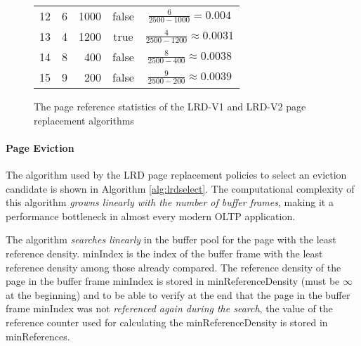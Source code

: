 \begin{@empty}
\begin{figure}[h]
\begin{tabular}{r|r|r|c|c}
            12 &   6  & 1000 & false & $\frac{6}{2500 - 1000} = 0.004$                      \\ \cline{2-4}
            13 &   4  & 1200 &  true & $\frac{4}{2500 - 1200} \approx 0.0031$               \\ \cline{2-4}
            14 &   8  &  400 & false & $\frac{8}{2500 - 400} \approx 0.0038$                \\ \cline{2-4}
            15 &   9  &  200 & false & $\frac{9}{2500 - 200} \approx 0.0039$                \\ \cline{2-4}
        \end{tabular}
        \vspace{.75em}
        \caption[Page reference statistics of LRD]{The page reference statistics of the LRD-V1 and LRD-V2 page replacement algorithms}
        \label{fig:lrd}
    \end{figure}
\end{@empty}

\paragraph{Page Eviction}

    The algorithm used by the LRD page replacement policies to select an eviction candidate is shown in Algorithm \ref{alg:lrdselect}. The computational complexity of this algorithm \emph{growns linearly with the number of buffer frames}, making it a performance bottleneck in almost every modern OLTP application.

    The algorithm \emph{searches linearly} in the buffer pool for the page with the least reference density. {\scriptsize minIndex} is the index of the buffer frame with the least reference density among those already compared. The reference density of the page in the buffer frame {\scriptsize minIndex} is stored in {\scriptsize minReferenceDensity} (must be $\infty$ at the beginning) and to be able to verify at the end that the page in the buffer frame {\scriptsize minIndex} was not \emph{referenced again during the search}, the value of the reference counter used for calculating the {\scriptsize minReferenceDensity} is stored in {\scriptsize minReferences}.

